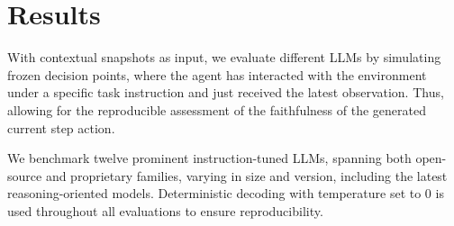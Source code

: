 \section{Results}
\vspace{-3mm}
\label{sec: results}
With contextual snapshots as input, we evaluate different LLMs by simulating frozen decision points, where the agent has interacted with the environment under a specific task instruction and just received the latest observation. Thus, allowing for the reproducible assessment of the faithfulness of the generated current step action.

We benchmark twelve prominent instruction-tuned LLMs, spanning both open-source and proprietary families, varying in size and version, including the latest reasoning-oriented models. Deterministic decoding with temperature set to 0 is used throughout all evaluations to ensure reproducibility.

\newcommand{\resulttablestyle}[2]{\setlength{\tabcolsep}{#1}\renewcommand{\arraystretch}{#2}\centering\footnotesize}

\newcommand\scline[1]{\noalign{\global\savewidth\arrayrulewidth
  \global\arrayrulewidth .8pt}\cline{#1}\noalign{\global\arrayrulewidth\savewidth}}

